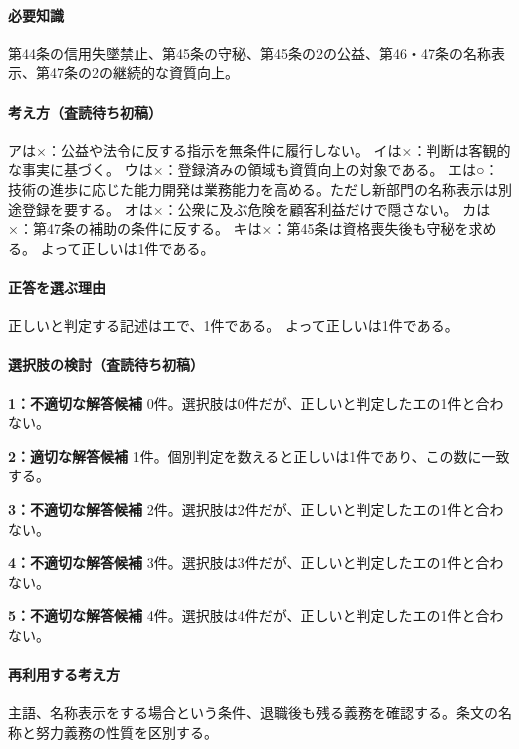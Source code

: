 \paragraph{必要知識} 第44条の信用失墜禁止、第45条の守秘、第45条の2の公益、第46・47条の名称表示、第47条の2の継続的な資質向上。

\paragraph{考え方（査読待ち初稿）} アは×：公益や法令に反する指示を無条件に履行しない。 イは×：判断は客観的な事実に基づく。 ウは×：登録済みの領域も資質向上の対象である。 エは○：技術の進歩に応じた能力開発は業務能力を高める。ただし新部門の名称表示は別途登録を要する。 オは×：公衆に及ぶ危険を顧客利益だけで隠さない。 カは×：第47条の補助の条件に反する。 キは×：第45条は資格喪失後も守秘を求める。 よって正しいは1件である。

\paragraph{正答を選ぶ理由} 正しいと判定する記述はエで、1件である。  よって正しいは1件である。

\paragraph{選択肢の検討（査読待ち初稿）}

\noindent\textbf{1：不適切な解答候補} 0件。選択肢は0件だが、正しいと判定したエの1件と合わない。\par

\noindent\textbf{2：適切な解答候補} 1件。個別判定を数えると正しいは1件であり、この数に一致する。\par

\noindent\textbf{3：不適切な解答候補} 2件。選択肢は2件だが、正しいと判定したエの1件と合わない。\par

\noindent\textbf{4：不適切な解答候補} 3件。選択肢は3件だが、正しいと判定したエの1件と合わない。\par

\noindent\textbf{5：不適切な解答候補} 4件。選択肢は4件だが、正しいと判定したエの1件と合わない。\par

\paragraph{再利用する考え方} 主語、名称表示をする場合という条件、退職後も残る義務を確認する。条文の名称と努力義務の性質を区別する。

